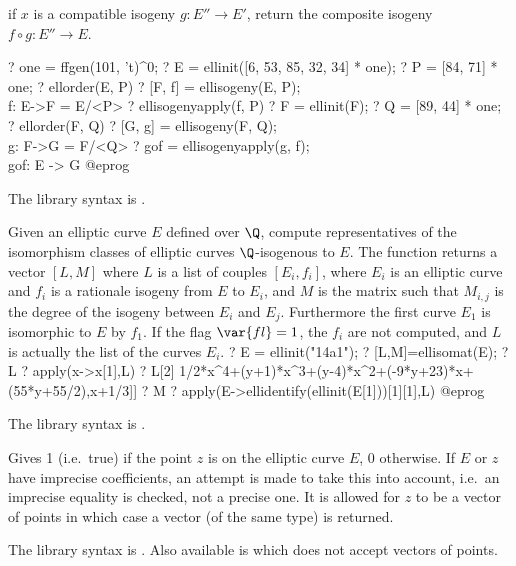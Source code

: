 \item if $x$ is a compatible isogeny $g:E''\to E'$, return the composite
isogeny $f \circ g:  E''\to E$.

\bprog
? one = ffgen(101, 't)^0;
? E = ellinit([6, 53, 85, 32, 34] * one);
? P = [84, 71] * one;
? ellorder(E, P)
? [F, f] = ellisogeny(E, P);  \\ f: E->F = E/<P>
? ellisogenyapply(f, P)
? F = ellinit(F);
? Q = [89, 44] * one;
? ellorder(F, Q)
? [G, g] = ellisogeny(F, Q); \\  g: F->G = F/<Q>
? gof = ellisogenyapply(g, f); \\ gof: E -> G
@eprog

The library syntax is .

\label{se:ellisomat}
Given an elliptic curve $E$ defined over $\Q$, compute representatives of the
isomorphism classes of elliptic curves $\Q$-isogenous to $E$. The function
returns a vector $[L,M]$ where $L$ is a list of couples $[E_i, f_i]$, where
$E_i$ is an elliptic curve and $f_i$ is a rationale isogeny from $E$ to $E_i$,
and $M$ is the matrix such that $M_{i,j}$ is the degree of the isogeny between
$E_i$ and $E_j$.
Furthermore the first curve $E_1$ is isomorphic to $E$ by $f_1$.
If the flag $\var{fl}=1$, the $f_i$ are not computed, and $L$ is actually the
list of the curves $E_i$.
\bprog
? E = ellinit("14a1");
? [L,M]=ellisomat(E);
? L
? apply(x->x[1],L)
? L[2]
       1/2*x^4+(y+1)*x^3+(y-4)*x^2+(-9*y+23)*x+(55*y+55/2),x+1/3]]
? M
? apply(E->ellidentify(ellinit(E[1]))[1][1],L)
@eprog

The library syntax is .

\label{se:ellisoncurve}
Gives 1 (i.e.~true) if the point $z$ is on the elliptic curve $E$, 0
otherwise. If $E$ or $z$ have imprecise coefficients, an attempt is made to
take this into account, i.e.~an imprecise equality is checked, not a precise
one. It is allowed for $z$ to be a vector of points in which case a vector
(of the same type) is returned.

The library syntax is .
Also available is  which does not
accept vectors of points.

